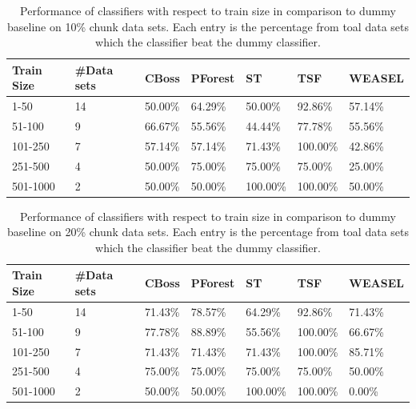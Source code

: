         \begin{table}[!ht]
            \setlength\extrarowheight{2pt} %
            \begin{tabularx}{\textwidth}{|X|X|X|X|X|X|X|}
            \hline
            \textbf{Train Size} & \textbf{\#Data sets} & \textbf{CBoss} & \textbf{PForest} & \textbf{ST} & \textbf{TSF} & \textbf{WEASEL} \\ \hline
                1-50 & 14 & 50.00\% & 64.29\% & 50.00\% & 92.86\% & 57.14\% \\ \hline
                51-100 & 9 & 66.67\% & 55.56\% & 44.44\% & 77.78\% & 55.56\% \\ \hline
                101-250 & 7 & 57.14\% & 57.14\% & 71.43\% & 100.00\% & 42.86\% \\ \hline
                251-500 & 4 & 50.00\% & 75.00\% & 75.00\% & 75.00\% & 25.00\% \\ \hline
                501-1000 & 2 &50.00\% & 50.00\% & 100.00\% & 100.00\% & 50.00\% \\ \hline
            \end{tabularx}
            \caption{Performance of classifiers with respect to train size in comparison to dummy baseline on 10\% chunk data sets. Each entry is the percentage from toal data sets which the classifier beat the dummy classifier.}
        \end{table}
        
        \begin{table}[!ht]
            \setlength\extrarowheight{2pt} %
            \begin{tabularx}{\textwidth}{|X|X|X|X|X|X|X|}
            \hline
            \textbf{Train Size} & \textbf{\#Data sets} & \textbf{CBoss} & \textbf{PForest} & \textbf{ST} & \textbf{TSF} & \textbf{WEASEL} \\ \hline
                1-50 & 14 & 71.43\% & 78.57\% & 64.29\% & 92.86\% & 71.43\% \\ \hline
                51-100 & 9 & 77.78\% & 88.89\% & 55.56\% & 100.00\% & 66.67\% \\ \hline
                101-250 & 7 & 71.43\% & 71.43\% & 71.43\% & 100.00\% & 85.71\% \\ \hline
                251-500 & 4 & 75.00\% & 75.00\% & 75.00\% & 75.00\% & 50.00\% \\ \hline
                501-1000 & 2 &50.00\% & 50.00\% & 100.00\% & 100.00\% & 0.00\% \\ \hline
            \end{tabularx}
            \caption{Performance of classifiers with respect to train size in comparison to dummy baseline on 20\% chunk data sets. Each entry is the percentage from toal data sets which the classifier beat the dummy classifier.}
        \end{table}
        
